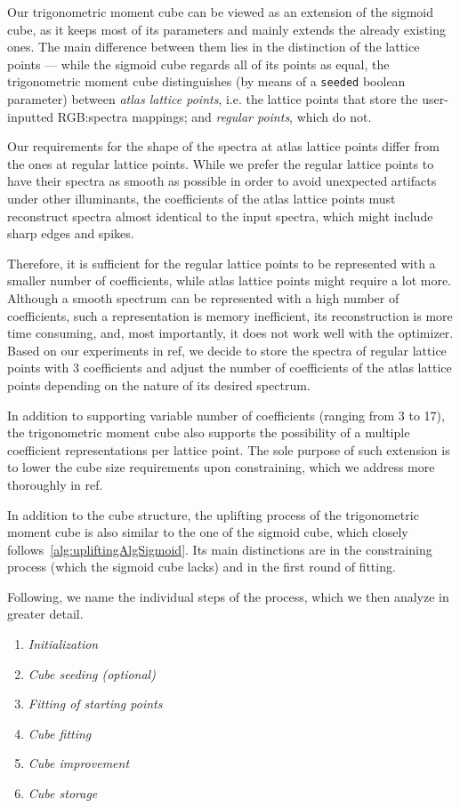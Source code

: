 Our trigonometric moment cube can be viewed as an extension of the sigmoid cube, as it keeps most of its parameters and mainly extends the already existing ones. The main difference between them lies in the distinction of the lattice points --- while the sigmoid cube regards all of its points as equal, the trigonometric moment cube distinguishes (by means of a \texttt{seeded} boolean parameter) between \emph{atlas lattice points}, i.e. the lattice points that store the user-inputted RGB:spectra mappings; and \emph{regular points}, which do not.

Our requirements for the shape of the spectra at atlas lattice points differ from the ones at regular lattice points. While we prefer the regular lattice points to have their spectra as smooth as possible in order to avoid unexpected artifacts under other illuminants, the coefficients of the atlas lattice points must reconstruct spectra almost identical to the input spectra, which might include sharp edges and spikes.

Therefore, it is sufficient for the regular lattice points to be represented with a smaller number of coefficients, while atlas lattice points might require a lot more. Although a smooth spectrum can be represented with a high number of coefficients, such a representation is memory inefficient, its reconstruction is more time consuming, and, most importantly, it does not work well with the optimizer. Based on our experiments in ref, we decide to store the spectra of regular lattice points with 3 coefficients and adjust the number of coefficients of the atlas lattice points depending on the nature of its desired spectrum.

In addition to supporting variable number of coefficients (ranging from 3 to 17), the trigonometric moment cube also supports the possibility of a multiple coefficient representations per lattice point. The sole purpose of such extension is to lower the cube size requirements upon constraining, which we address more thoroughly in ref.

In addition to the cube structure, the uplifting process of the trigonometric moment cube is also similar to the one of the sigmoid cube, which closely follows~\cref{alg:upliftingAlgSigmoid}. Its main distinctions are in the constraining process (which the sigmoid cube lacks) and in the first round of fitting.

Following, we name the individual steps of the process, which we then analyze in greater detail.
\begin{enumerate}
	\item \emph{Initialization}
	\item \emph{Cube seeding (optional)}
	\item \emph{Fitting of starting points}
	\item \emph{Cube fitting}
	\item \emph{Cube improvement}
	\item \emph{Cube storage}
\end{enumerate}

